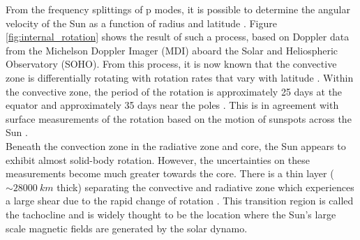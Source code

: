 \documentclass[11pt,a4paper,onecolumn]{report}
\begin{document}

From the frequency splittings of p modes, it is possible to determine the
angular velocity of the Sun as a function of radius and latitude
\citep{schou_helioseismic_1998}. Figure \ref{fig:internal_rotation} shows the
result of such a process, based on Doppler data from the Michelson Doppler
Imager (MDI) aboard the Solar and Heliospheric Observatory (SOHO). From this
process, it is now known that the convective zone is differentially rotating
with rotation rates that vary with latitude \citep{eff2012dynamics}. Within the
convective zone, the period of the rotation is approximately 25 days at the
equator and approximately 35 days near the poles \citep{hughes2007solar}. This
is in agreement with surface measurements of the rotation based on the motion of
sunspots across the Sun \citep{schou_helioseismic_1998}. \\


Beneath the convection zone in the radiative zone and core, the Sun appears to
exhibit almost solid-body rotation. However, the uncertainties on these
measurements become much greater towards the core. There is a thin layer
(\(\sim \SI{28000}{km}\) thick) separating the convective and radiative zone which
experiences a large shear due to the rapid change of rotation
\citep{spiegel1992}. This transition region is called the tachocline and is
widely thought to be the location where the Sun's large scale magnetic fields are
generated by the solar dynamo.
\end{document}
